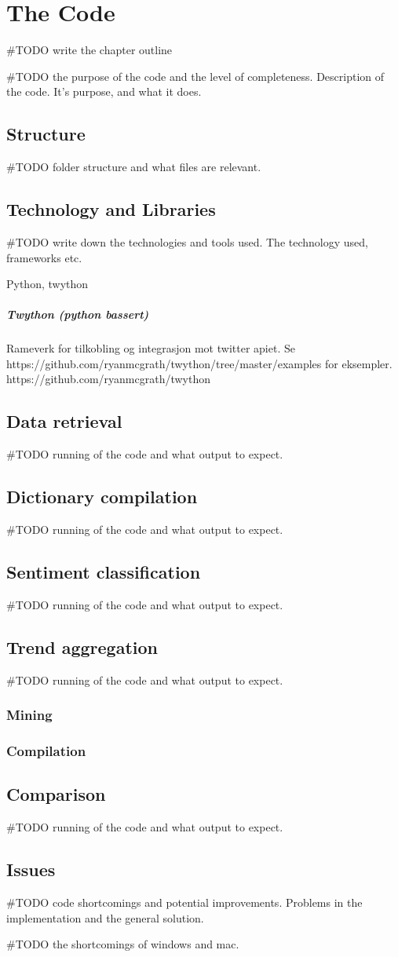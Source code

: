 \chapter{The Code}
#TODO write the chapter outline 

#TODO the purpose of the code and the level of completeness. 
Description of the code. It's purpose, and what it does. 

\section{Structure}
#TODO folder structure and what files are relevant. 

\section{Technology and Libraries}
#TODO write down the technologies and tools used. 
The technology used, frameworks etc.

Python, twython

\paragraph{Twython (python bassert)}
Rameverk for tilkobling og integrasjon mot twitter apiet.
Se https://github.com/ryanmcgrath/twython/tree/master/examples for eksempler.
https://github.com/ryanmcgrath/twython
 
\section{Data retrieval}
#TODO running of the code and what output to expect. 
\section{Dictionary compilation}
#TODO running of the code and what output to expect. 
\section{Sentiment classification}
#TODO running of the code and what output to expect. 
\section{Trend aggregation}
#TODO running of the code and what output to expect. 
\subsection{Mining}
\subsection{Compilation}
\section{Comparison}
#TODO running of the code and what output to expect. 

\section{Issues}
#TODO code shortcomings and potential improvements. 
Problems in the implementation and the general solution.

#TODO the shortcomings of windows and mac. 

